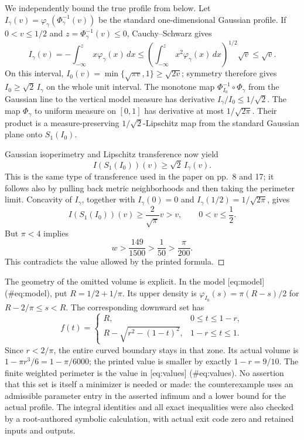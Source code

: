 \documentclass[10pt]{article}
\begin{document}
We independently bound the true profile from below. Let \(I_\gamma(v)=\varphi_\gamma(\Phi_\gamma^{-1}(v))\) be the standard one-dimensional Gaussian profile. If \(0<v\leq1/2\) and \(z=\Phi_\gamma^{-1}(v)\leq0\), Cauchy–Schwarz gives \[I_\gamma(v)=-\int_{-\infty}^{z}x\varphi_\gamma(x)\,dx
 \leq
 \left(\int_{-\infty}^{z}x^2\varphi_\gamma(x)\,dx\right)^{1/2}
 \sqrt v\leq\sqrt v.\] On this interval, \(I_0(v)=\min\{\sqrt{\pi v},1\}
\geq\sqrt{2v}\); symmetry therefore gives \(I_0\geq\sqrt2\,I_\gamma\) on the whole unit interval. The monotone map \(\Phi_{I_0}^{-1}\circ\Phi_\gamma\) from the Gaussian line to the vertical model measure has derivative \(I_\gamma/I_0\leq1/\sqrt2\). The map \(\Phi_\gamma\) to uniform measure on \([0,1]\) has derivative at most \(1/\sqrt{2\pi}\). Their product is a measure-preserving \(1/\sqrt2\)-Lipschitz map from the standard Gaussian plane onto \(S_1(I_0)\).\par
Gaussian isoperimetry and Lipschitz transference now yield \[I(S_1(I_0))(v)\geq\sqrt2\,I_\gamma(v).\] This is the same type of transference used in the paper on pp. 8 and 17; it follows also by pulling back metric neighborhoods and then taking the perimeter limit. Concavity of \(I_\gamma\), together with \(I_\gamma(0)=0\) and \(I_\gamma(1/2)=1/\sqrt{2\pi}\), gives \[I(S_1(I_0))(v)\geq\frac{2}{\sqrt\pi}v>v,
 \qquad 0<v\leq\frac12.\] But \(\pi<4\) implies \[w>\frac{149}{1500}>\frac1{50}>\frac{\pi}{200}.\] This contradicts the value allowed by the printed formula. ◻\par
The geometry of the omitted volume is explicit. In the model [eq:model] (\#eq:model), put \(R=1/2+1/\pi\). Its upper density is \(\varphi_{I_0}(s)=\pi(R-s)/2\) for \(R-2/\pi\leq s<R\). The corresponding downward set has \[f(t)=
 \begin{cases}
 R,&0\leq t\leq1-r,\\
 R-\sqrt{r^2-(1-t)^2},&1-r\leq t\leq1.
 \end{cases}\] Since \(r<2/\pi\), the entire curved boundary stays in that zone. Its actual volume is \(1-\pi r^3/6=1-\pi/6000\); the printed value is smaller by exactly \(1-r=9/10\). The finite weighted perimeter is the value in [eq:values] (\#eq:values). No assertion that this set is itself a minimizer is needed or made: the counterexample uses an admissible parameter entry in the asserted infimum and a lower bound for the actual profile. The integral identities and all exact inequalities were also checked by a root-authored symbolic calculation, with actual exit code zero and retained inputs and outputs.\par
\end{document}
